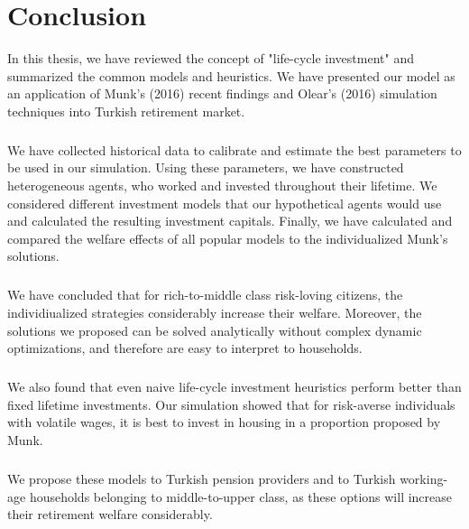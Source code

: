 \chapter{Conclusion}
\label{conclusion}

In this thesis, we have reviewed the concept of "life-cycle investment" and summarized the common models and heuristics. We have presented our model as an application of Munk's (2016) recent findings and Olear's (2016) simulation techniques into Turkish retirement market.

\paragraph{}We have collected historical data to calibrate and estimate the best parameters to be used in our simulation. Using these parameters, we have constructed heterogeneous agents, who worked and invested throughout their lifetime. We considered different investment models that our hypothetical agents would use and calculated the resulting investment capitals. Finally, we have calculated and compared the welfare effects of all popular models to the individualized Munk's solutions.

\paragraph{}We have concluded that for rich-to-middle class risk-loving citizens, the individiualized strategies considerably increase their welfare. Moreover, the solutions we proposed can be solved analytically without complex dynamic optimizations, and therefore are easy to interpret to households.

\paragraph{}We also found that even naive life-cycle investment heuristics perform better than fixed lifetime investments. Our simulation showed that for risk-averse individuals with volatile wages, it is best to invest in housing in a proportion proposed by Munk.

\paragraph{}We propose these models to Turkish pension providers and to Turkish working-age households belonging to middle-to-upper class, as these options will increase their retirement welfare considerably.

